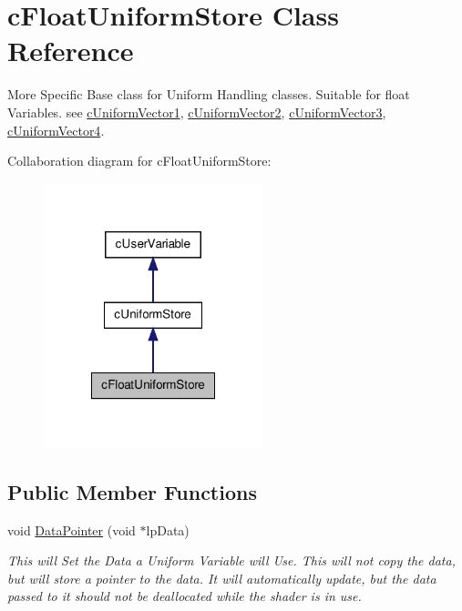 \hypertarget{classc_float_uniform_store}{
\section{cFloatUniformStore Class Reference}
\label{classc_float_uniform_store}
}


More Specific Base class for Uniform Handling classes. Suitable for float Variables. see \hyperlink{classc_uniform_vector1}{cUniformVector1}, \hyperlink{classc_uniform_vector2}{cUniformVector2}, \hyperlink{classc_uniform_vector3}{cUniformVector3}, \hyperlink{classc_uniform_vector4}{cUniformVector4}.  




Collaboration diagram for cFloatUniformStore:\nopagebreak
\begin{figure}[H]
\begin{center}
\leavevmode
\includegraphics[width=180pt]{classc_float_uniform_store__coll__graph}
\end{center}
\end{figure}
\subsection*{Public Member Functions}
\begin{DoxyCompactItemize}
\item 
\hypertarget{classc_float_uniform_store_a95ff7fe17352d7da93382001706db97d}{
void \hyperlink{classc_float_uniform_store_a95ff7fe17352d7da93382001706db97d}{DataPointer} (void $\ast$lpData)}
\label{classc_float_uniform_store_a95ff7fe17352d7da93382001706db97d}

\begin{DoxyCompactList}\small\item\em This will Set the Data a Uniform Variable will Use. This will not copy the data, but will store a pointer to the data. It will automatically update, but the data passed to it should not be deallocated while the shader is in use. \end{DoxyCompactList}\end{DoxyCompactItemize}


